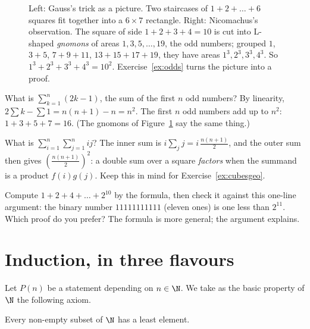 \begin{figure}[ht]
\centering
{}
\caption{Left: Gauss's trick as a picture. Two staircases of $1+2+\dots+6$ squares fit together into a $6\times7$ rectangle. Right: Nicomachus's observation. The square of side $1+2+3+4=10$ is cut into L-shaped \emph{gnomons} of areas $1,3,5,\dots,19$, the odd numbers; grouped $1$, $3+5$, $7+9+11$, $13+15+17+19$, they have areas $1^3,2^3,3^3,4^3$. So $1^3+2^3+3^3+4^3=10^2$. Exercise~\ref{ex:odds} turns the picture into a proof.}
\label{fig:gauss}
\end{figure}

\begin{examplex}
What is $\sum_{k=1}^n(2k-1)$, the sum of the first $n$ odd numbers? By linearity, $2\sum k-\sum1=n(n+1)-n=n^2$. The first $n$ odd numbers add up to
$n^2$: $1+3+5+7=16$. (The gnomons of Figure~\ref{fig:gauss} say the same thing.)

What is $\sum_{i=1}^n\sum_{j=1}^nij$? The inner sum is $i\sum_jj=i\,\frac{n(n+1)}2$, and the outer sum then gives
$\left(\frac{n(n+1)}2\right)^2$: a double sum over a square \emph{factors} when the summand is a product $f(i)g(j)$. Keep this in mind for Exercise~\ref{ex:cubesgeo}.
\end{examplex}

\begin{think}
Compute $1+2+4+\dots+2^{10}$ by the formula, then check it against this one-line argument: the binary number $11111111111$ (eleven ones) is one
less than $2^{11}$. Which proof do you prefer? The formula is more general; the argument explains.
\end{think}

\section{Induction, in three flavours}

Let $P(n)$ be a statement depending on $n\in\N$. We take as the basic property of $\N$ the following axiom.

\begin{reminder}
Every non-empty subset of $\N$ has a least element.
\end{reminder}

